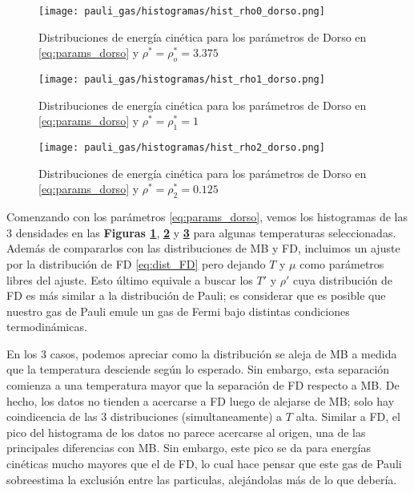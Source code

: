 \begin{figure}[H]
	\centering
	\texttt{[image: pauli\_gas/histogramas/hist\_rho0\_dorso.png]}
	\caption{Distribuciones de energía cinética para los parámetros de Dorso en \eqref{eq:params_dorso} y $\rho^* = \rho_o^* = 3.375$}
	\label{fig:hist_rho0_dorso}
\end{figure}

\begin{figure}[H]
	\centering
	\texttt{[image: pauli\_gas/histogramas/hist\_rho1\_dorso.png]}
	\caption{Distribuciones de energía cinética para los parámetros de Dorso en \eqref{eq:params_dorso} y $\rho^* = \rho_1^* = 1$}
	\label{fig:hist_rho1_dorso}
\end{figure}
\begin{figure}[H]
	\centering
	\texttt{[image: pauli\_gas/histogramas/hist\_rho2\_dorso.png]}
	\caption{Distribuciones de energía cinética para los parámetros de Dorso en \eqref{eq:params_dorso} y $\rho^* = \rho_2^* = 0.125$}
	\label{fig:hist_rho2_dorso}
\end{figure}

Comenzando con los parámetros \eqref{eq:params_dorso}, vemos los histogramas de las 3 densidades en las \textbf{Figuras \ref{fig:hist_rho0_dorso}},
\textbf{\ref{fig:hist_rho1_dorso}} y \textbf{\ref{fig:hist_rho2_dorso}} para algunas temperaturas seleccionadas.
Además de compararlos con las distribuciones de MB y FD, incluimos un ajuste por la distribución de FD \eqref{eq:dist_FD} pero dejando $T$ y $\mu$ como parámetros libres del ajuste.
Esto último equivale a buscar los $T'$ y $\rho'$ cuya distribución de FD es más similar a la distribución de Pauli; es considerar que es posible que nuestro gas de Pauli
emule un gas de Fermi bajo distintas condiciones termodinámicas.

En los 3 casos, podemos apreciar como la distribución se aleja de MB a medida que la temperatura desciende según lo esperado.
Sin embargo, esta separación comienza a una temperatura mayor que la separación de FD respecto a MB.
De hecho, los datos no tienden a acercarse a FD luego de alejarse de MB; solo hay coindicencia de las 3 distribuciones (simultaneamente) a $T$ alta.
Similar a FD, el pico del histograma de los datos no parece acercarse al origen, una de las principales diferencias con MB.
Sin embargo, este pico se da para energías cinéticas mucho mayores que el de FD, lo cual hace pensar que este gas de Pauli sobreestima la exclusión entre las particulas, alejándolas
más de lo que debería.

